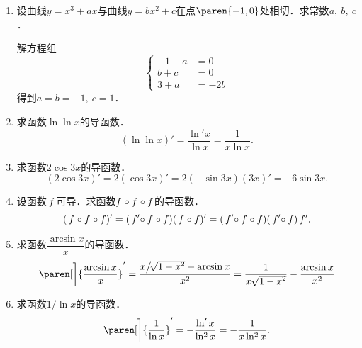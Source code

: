 \begin{enumerate}
\item 设曲线\(y = x^3 + ax\)与曲线\(y = bx^2 + c\)在点\(\paren{-1,0}\)处相切．求常数\(a,\ b,\ c\)．

  \ifshowsol
    解方程组
    \begin{equation*}
      \left\{
        \begin{aligned}
          -1 - a &= 0 \\
          b + c &= 0 \\
          3 + a &= -2b
        \end{aligned}
      \right.
    \end{equation*}
    得到\(a = b = -1,\ c = 1\)．
  \fi

\item 求函数\(\ln\ln x\)的导函数．
  \ifshowsol
    \begin{equation*}
      (\ln\ln x)'
      = \frac{\ln' x}{\ln x}
      = \frac{1}{x \ln x}.
    \end{equation*}
  \fi

\item 求函数\(2\cos3x\)的导函数．
  \ifshowsol
    \begin{equation*}
      (2\cos3x)' = 2(\cos3x)' = 2(-\sin3x)(3x)' = -6\sin3x.
    \end{equation*}
  \fi

\item 设函数\(\,f\mkern2mu\)可导．求函数\(f\mkern1mu \circ f\mkern1mu \circ f\)的导函数．
  \ifshowsol
    \begin{equation*}
      (\,f\mkern1mu \circ f\mkern1mu \circ f)'
      = (\,f'\mkern-4mu \circ f\mkern1mu \circ f) (\,f\mkern1mu \circ f)'
      = (\,f'\mkern-4mu \circ f\mkern1mu \circ f) (\,f'\mkern-4mu \circ f) \,f'.
    \end{equation*}
  \fi

\item 求函数\(\dfrac{\arcsin x}{x}\)的导函数．
  \ifshowsol
    \begin{equation*}
      \paren[\bigg]{\frac{\arcsin x}{x}}'
      = \frac{x\big/\!\sqrt{1-\smash{x^2}} - \arcsin x}{x^2}
      = \frac{1}{x \sqrt{1-\smash{x^2}}} - \frac{\arcsin x}{x^2}
    \end{equation*}
  \fi

\item 求函数\(1/\!\ln x\)的导函数．
  \ifshowsol
    \begin{equation*}
      \paren[\bigg]{\frac1{\ln x}}'
      = - \frac{\ln'x}{\operatorname{ln^2} x}
      = - \frac{1}{x \operatorname{ln^2} x}.
    \end{equation*}
  \fi


\end{enumerate}
